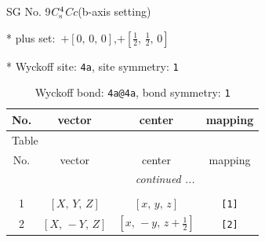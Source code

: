 \documentclass[fleqn,8pt]{jsarticle}
\begin{document}
\setcounter{MaxMatrixCols}{32}

\renewcommand{\tablename}{Table~}
\renewcommand{\figurename}{Figure~}
\begin{center}
\LARGE
SG No. 9\quad$C_{\rm s}^{4}$\quad$Cc$\quad(b-axis setting)\quad[ monoclinic ]
\end{center}

* plus set:\,\,\,$+\left[ 0,\, 0,\, 0 \right]$,\quad $+\left[ \frac{1}{2},\, \frac{1}{2},\, 0 \right]$


* Wyckoff site: {\tt 4a}, site symmetry: {\tt 1}
\renewcommand{\arraystretch}{1.2}
\begin{longtable}{cccc}
\caption{Wyckoff bond: {\tt 4a@4a}, bond symmetry: {\tt 1}}
 \\
 \hline \hline
No. & vector & center & mapping \\ \hline \endfirsthead

\multicolumn{3}{l}{\tablename\ \thetable{}} \\
 \hline \hline
No. & vector & center & mapping \\ \hline \endhead

 \hline \hline
\multicolumn{3}{r}{\footnotesize\it continued ...} \\ \endfoot

 \hline \hline
\multicolumn{3}{r}{} \\ \endlastfoot

1 & $\left[ X,\, Y,\, Z \right]$ & $\left[ x,\, y,\, z \right]$ & {\tt [1]} \\ \hline
2 & $\left[ X,\, - Y,\, Z \right]$ & $\left[ x,\, - y,\, z + \frac{1}{2} \right]$ & {\tt [2]} \\
\end{longtable}
\end{document}
